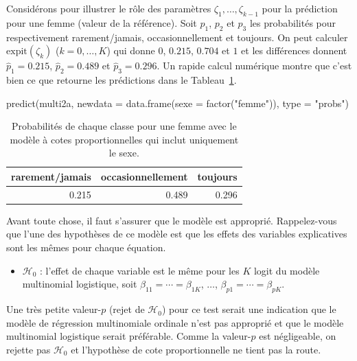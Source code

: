 \documentclass[
  11pt,
  letterpaper,
]{scrbook}
\newenvironment{Shaded}{\begin{snugshade}}{\end{snugshade}}
\newcommand{\AttributeTok}[1]{\textcolor[rgb]{0.40,0.45,0.13}{#1}}
\newcommand{\FunctionTok}[1]{\textcolor[rgb]{0.28,0.35,0.67}{#1}}
\newcommand{\NormalTok}[1]{\textcolor[rgb]{0.00,0.23,0.31}{#1}}
\newcommand{\StringTok}[1]{\textcolor[rgb]{0.13,0.47,0.30}{#1}}
\providecommand{\tightlist}{%
  \setlength{\itemsep}{0pt}\setlength{\parskip}{0pt}}\usepackage{longtable,booktabs,array}
\theoremstyle{definition}
\theoremstyle{remark}
\begin{document}
Considérons pour illustrer le rôle des paramètres
\(\zeta_1, \ldots, \zeta_{k-1}\) pour la prédiction pour une femme
(valeur de la référence). Soit \(p_1\), \(p_2\) et \(p_3\) les
probabilités pour respectivement rarement/jamais, occasionnellement et
toujours. On peut calculer \(\mathrm{expit}(\zeta_k)\)
(\(k=0, \ldots, K\)) qui donne \(0\), \(0.215\), \(0.704\) et \(1\) et
les différences donnent \(\widehat{p}_1 = 0.215\),
\(\widehat{p}_2 = 0.489\) et \(\widehat{p}_3 = 0.296\). Un rapide calcul
numérique montre que c'est bien ce que retourne les prédictions dans le
Tableau~\ref{tbl-predpolr}.

\begin{Shaded}
\begin{Highlighting}[]
\FunctionTok{predict}\NormalTok{(multi2a, }
        \AttributeTok{newdata =} \FunctionTok{data.frame}\NormalTok{(}\AttributeTok{sexe =} \FunctionTok{factor}\NormalTok{(}\StringTok{"femme"}\NormalTok{)), }
        \AttributeTok{type =} \StringTok{"probs"}\NormalTok{)}
\end{Highlighting}
\end{Shaded}

\hypertarget{tbl-predpolr}{}
\begin{table}
\caption{\label{tbl-predpolr}Probabilités de chaque classe pour une femme avec le modèle à cotes
proportionnelles qui inclut uniquement le sexe. }\tabularnewline

\centering
\begin{tabular}{rrr}
\toprule
rarement/jamais & occasionnellement & toujours\\
\midrule
0.215 & 0.489 & 0.296\\
\bottomrule
\end{tabular}
\end{table}

Avant toute chose, il faut s'assurer que le modèle est approprié.
Rappelez-vous que l'une des hypothèses de ce modèle est que les effets
des variables explicatives sont les mêmes pour chaque équation.

\begin{itemize}
\tightlist
\item
  \(\mathscr{H}_0\) : l'effet de chaque variable est le même pour les
  \(K\) logit du modèle multinomial logistique, soit
  \(\beta_{11} = \cdots =\beta_{1K}\), \(\ldots\),
  \(\beta_{p1} = \cdots =\beta_{pK}\).
\end{itemize}

Une très petite valeur-\(p\) (rejet de \(\mathscr{H}_0\)) pour ce test
serait une indication que le modèle de régression multinomiale ordinale
n'est pas approprié et que le modèle multinomial logistique serait
préférable. Comme la valeur-\(p\) est négligeable, on rejette pas
\(\mathscr{H}_0\) et l'hypothèse de cote proportionnelle ne tient pas la
route.
\end{document}
